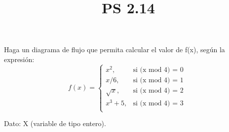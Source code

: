 \documentclass[11pt]{amsart}
\title{PS 2.14}
\begin{document}
\maketitle
Haga un diagrama de flujo que permita calcular el valor de f(x), según la expresión: \\

\[
f(x) =
\begin{cases}
     x^2, & \text{si (x mod 4) = 0 }  \\
    x/6, & \text{si (x mod 4) = 1 }  \\
    \sqrt{x}, & \text{si (x mod 4) = 2 }  \\
    x^3 + 5, & \text{si (x mod 4) = 3 }  \\
\end{cases}
\]

Dato: X (variable de tipo entero).
\end{document}
